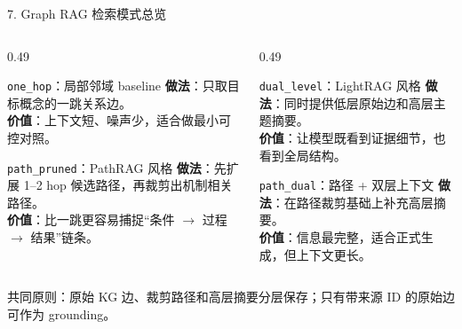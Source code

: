 \documentclass[aspectratio=169,UTF8]{ctexbeamer}
\newcommand{\code}[1]{\texttt{#1}}
\begin{document}
\begin{frame}{7. Graph RAG 检索模式总览}
  \small
  \begin{columns}[T,onlytextwidth]
    \begin{column}{0.49\textwidth}
      \begin{block}{\code{one\_hop}：局部邻域 baseline}
        \textbf{做法}：只取目标概念的一跳关系边。\\
        \textbf{价值}：上下文短、噪声少，适合做最小可控对照。
      \end{block}

      \begin{block}{\code{path\_pruned}：PathRAG 风格}
        \textbf{做法}：先扩展 1--2 hop 候选路径，再裁剪出机制相关路径。\\
        \textbf{价值}：比一跳更容易捕捉“条件 $\rightarrow$ 过程 $\rightarrow$ 结果”链条。
      \end{block}
    \end{column}
    \begin{column}{0.49\textwidth}
      \begin{block}{\code{dual\_level}：LightRAG 风格}
        \textbf{做法}：同时提供低层原始边和高层主题摘要。\\
        \textbf{价值}：让模型既看到证据细节，也看到全局结构。
      \end{block}

      \begin{block}{\code{path\_dual}：路径 + 双层上下文}
        \textbf{做法}：在路径裁剪基础上补充高层摘要。\\
        \textbf{价值}：信息最完整，适合正式生成，但上下文更长。
      \end{block}
    \end{column}
  \end{columns}

  \vspace{0.3em}
  \footnotesize
  共同原则：原始 KG 边、裁剪路径和高层摘要分层保存；只有带来源 ID 的原始边可作为 grounding。
\end{frame}
\end{document}
